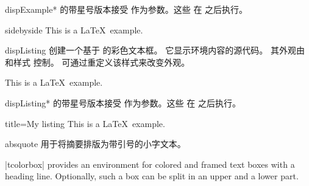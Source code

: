 {\let\xdispExample\dispExample
  \let\endxdispExample\enddispExample
\begin{docEnvironment}[doc updated=2014-10-10]{dispExample*}{}
   的带星号版本接受  
  作为参数。这些  在  之后执行。
\begin{xdispExample}
\begin{dispExample*}{sidebyside}
This is a \LaTeX\ example.
\end{dispExample*}
\end{xdispExample}
\end{docEnvironment}}


\clearpage
\begin{docEnvironment}{dispListing}{}
  创建一个基于  的彩色文本框。
  它显示环境内容的源代码。
  其外观由 
  和样式  控制。
  可通过重定义该样式来改变外观。
\begin{dispExample}
\begin{dispListing}
This is a \LaTeX\ example.
\end{dispListing}
\end{dispExample}
\end{docEnvironment}

\begin{docEnvironment}{dispListing*}{}
   的带星号版本接受  
  作为参数。这些  在  之后执行。
\begin{dispExample}
\begin{dispListing*}{title=My listing}
This is a \LaTeX\ example.
\end{dispListing*}
\end{dispExample}
\end{docEnvironment}


\begin{docEnvironment}{absquote}{}
  用于将摘要排版为带引号的小字文本。
\begin{dispExample}
\begin{absquote}
|tcolorbox| provides an environment for colored and framed text boxes with a
heading line. Optionally, such a box can be split in an upper and a lower part.
\end{absquote}
\end{dispExample}
\end{docEnvironment}

